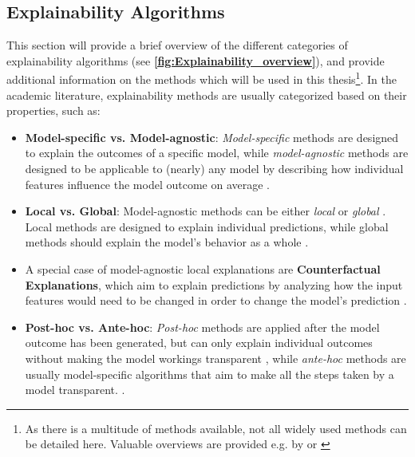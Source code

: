 \subsection{Explainability Algorithms}\label{subsec:algorithms}

This section will provide a brief overview of the different categories of explainability algorithms (see \textbf{\ref{fig:Explainability_overview}}), and provide additional information on the methods which will be used in this thesis\footnote{As there is a multitude of methods available, not all widely used methods can be detailed here. Valuable overviews are provided e.g. by \cite{SALEEM2022165} or \cite{Molnar2023}}.
In the academic literature, explainability methods are usually categorized based on their properties, such as:
\begin{itemize}
    \item \textbf{Model-specific vs. Model-agnostic}: \textit{Model-specific} methods are designed to explain the outcomes of a specific model, while \textit{model-agnostic} methods are designed to be applicable to (nearly) any model by describing how individual features influence the model outcome on average \parencite{Molnar2023}.
    \item \textbf{Local vs. Global}: Model-agnostic methods can be either \textit{local} or \textit{global} \parencite{Molnar2023}. Local methods are designed to explain individual predictions, while global methods should explain the model's behavior as a whole \parencite{SALEEM2022165}.
    \item A special case of model-agnostic local explanations are \textbf{Counterfactual Explanations}, which aim to explain predictions by analyzing how the input features would need to be changed in order to change the model's prediction \parencite{wachter2017}.
    \item \textbf{Post-hoc vs. Ante-hoc}: \textit{Post-hoc} methods are applied after the model outcome has been generated, but can only explain individual outcomes without making the model workings transparent \parencite{Lipton2018}, while \textit{ante-hoc} methods are usually model-specific algorithms that aim to make all the steps taken by a model transparent. \parencite{SALEEM2022165}.
\end{itemize}


